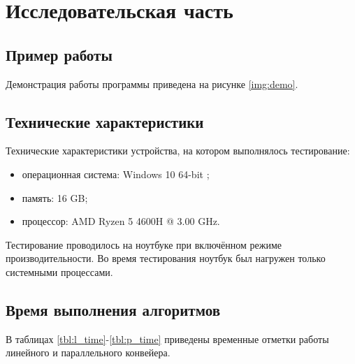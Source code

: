 \chapter{Исследовательская часть}

\section{Пример работы}

Демонстрация работы программы приведена на рисунке \ref{img:demo}.


\section{Технические характеристики}

Технические характеристики устройства, на котором выполнялось тестирование:

\begin{itemize}
	\item операционная система: Windows 10 64-bit \cite{windows};
	\item память: 16 GB;
	\item процессор: AMD Ryzen 5 4600H \cite{amd} @ 3.00 GHz.
\end{itemize}

Тестирование проводилось на ноутбуке при включённом режиме производительности. Во время тестирования ноутбук был нагружен только системными процессами.

\section{Время выполнения алгоритмов}

В таблицах \ref{tbl:l_time}-\ref{tbl:p_time} приведены временные отметки работы линейного и параллельного конвейера.


